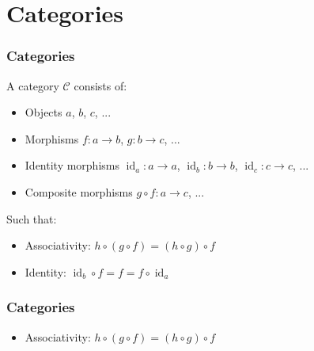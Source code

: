 \documentclass{beamer}
\DeclareMathOperator{\id}{id}
\newcommand{\idO}[1]{\natO{\id}{#1}}
\newcommand{\comp}{\ensuremath{\mathrel{\circ}}}
\newcommand{\cat}[1]{\ensuremath{\mathcal{#1}}}
\newcommand{\nat}[1]{\ensuremath{#1}}
\newcommand{\natO}[2]{\ensuremath{\nat{#1}_{#2}}}
\begin{document}
\section{Categories}


\begin{frame}[label={def:category}]
  \frametitle{Categories}

  \begin{definition}[Category]
    A category \cat{C} consists of:
    \begin{itemize}
    \item
      Objects $a$, $b$, $c$, ...
    \item
      Morphisms $f: a \to b$, $g: b \to c$, ...
    \item
      Identity morphisms $\idO{a}: a \to a$, $\idO{b}: b \to b$,
      $\idO{c}: c \to c$, ...
    \item
      Composite morphisms $g \comp f: a \to c$, ...
    \end{itemize}
    Such that:
    \begin{itemize}
    \item
      Associativity: $h \comp (g \comp f) = (h \comp g) \comp f$
    \item
      Identity: $\idO{b} \comp f = f = f \comp \idO{a}$
    \end{itemize}
  \end{definition}

\end{frame}


\begin{frame}
  \frametitle{Categories}

  \begin{definition}[Category]
    \begin{itemize}
    \item
      Associativity: $h \comp (g \comp f) = (h \comp g) \comp f$
    \end{itemize}
  \end{definition}
  \begin{center}
  \end{center}

\end{frame}
\end{document}

